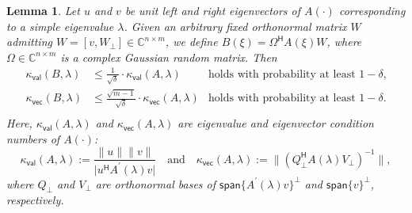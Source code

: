 \documentclass[a4paper,11pt]{article}
\newtheorem{lemma}{Lemma}
\newcommand{\Htran}{\mathsf{H}}
\newcommand{\defi}{:=}
\newcommand{\C}{\mathbb{C}}
\newcommand{\kval}{\kappa_{\mathsf{val}}}
\newcommand{\kvec}{\kappa_{\mathsf{vec}}}
\providecommand{\spa}[1]{\mathsf{span}\{#1\}}
\providecommand{\abs}[1]{\lvert#1\rvert}
\providecommand{\norm}[1]{\lVert#1\rVert}
\providecommand{\bignorm}[1]{\bigl\lVert#1\bigr\rVert}
\begin{document}
\begin{lemma}
    \label{lem:kappa}
    Let $u$ and $v$ be unit left and right eigenvectors of $A(\cdot)$ corresponding to a simple eigenvalue $\lambda$.
    Given an arbitrary fixed orthonormal matrix $W$ admitting $W=[v,W_{\perp}]\in\C^{n\times m}$, we define $B(\xi)=\Omega^{\Htran}A(\xi)W$, where $\Omega\in\C^{n\times m}$ is a complex Gaussian random matrix. Then 
    \begin{equation*}
        \begin{aligned}
                \kval(B,\lambda) &\leq  \frac{1}{\sqrt{\delta}}\cdot \kval(A,\lambda) &\text{holds with probability at least $1-\delta$,}\\ 
                \kvec(B,\lambda) &\leq  \frac{\sqrt{m-1}}{\sqrt{\delta}}\cdot \kvec(A,\lambda) &\text{holds with probability at least $1-\delta$.}\\ 
        \end{aligned}
    \end{equation*}
    Here, $\kval(A,\lambda)$ and $\kvec(A,\lambda)$ are eigenvalue and eigenvector condition numbers of $A(\cdot)$:
    \begin{equation}
        \label{eq:defkappaA}
        \kval(A,\lambda)\defi \frac{\norm{u}\norm{v}}{\abs{u^{\Htran}A^{\prime}(\lambda)v}}
        \quad\text{and}\quad 
        \kvec(A,\lambda)\defi \bignorm{(Q_{\perp}^{\Htran}A(\lambda)V_{\perp})^{-1}},
    \end{equation}
    where $Q_{\perp}$ and $V_{\perp}$ are orthonormal bases of $\spa{A^{\prime}(\lambda)v}^{\perp}$ and $\spa{v}^{\perp}$, respectively.

\end{lemma}
\end{document}
